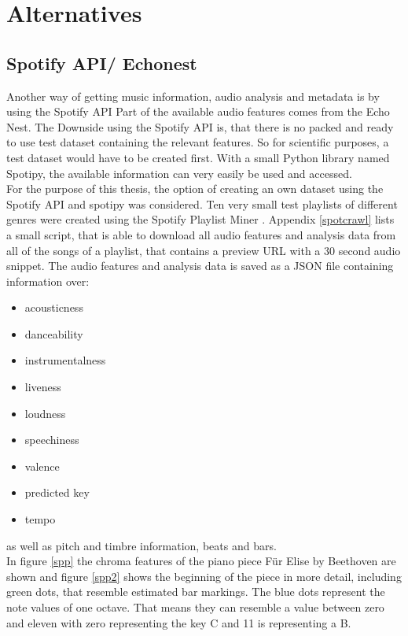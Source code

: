 \section{Alternatives}

\subsection{Spotify API/ Echonest}\label{spotipy}

Another way of getting music information, audio analysis and metadata is by using the Spotify API\cite{spotifyapi1}
Part of the available audio features comes from the Echo Nest\cite{echonest1}.
The Downside using the Spotify API is, that there is no packed and ready to use test dataset containing the relevant features. So for scientific purposes, a test dataset would have to be created first. With a small Python library named Spotipy, the available information can very easily be used and accessed. \cite{spotipy1}\\
For the purpose of this thesis, the option of creating an own dataset using the Spotify API and spotipy was considered. 
Ten very small test playlists of different genres were created using the Spotify Playlist Miner \cite{spotmin1}. 
Appendix \ref{spotcrawl} lists a small script, that is able to download all audio features and analysis data from all of the songs of a playlist, that contains a preview URL with a 30 second audio snippet. The audio features and analysis data is saved as a JSON file containing information over:
\begin{itemize}
	\setlength\itemsep{0em}
	\item acousticness
	\item danceability
	\item instrumentalness
	\item liveness
	\item loudness
	\item speechiness
	\item valence
	\item predicted key
	\item tempo 
\end{itemize}
as well as pitch and timbre information, beats and bars.\\
In figure \ref{spp} the chroma features of the piano piece Für Elise by Beethoven are shown and figure \ref{spp2} shows the beginning of the piece in more detail, including green dots, that resemble estimated bar markings. The blue dots represent the note values of one octave. That means they can resemble a value between zero and eleven with zero representing the key C and 11 is representing a B.

